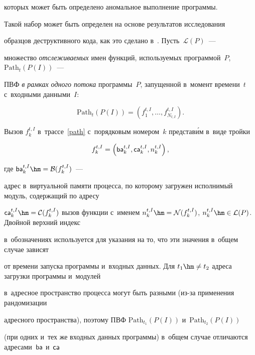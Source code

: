 которых может быть определено аномальное выполнение программы. 

Такой набор может быть определен на основе результатов исследования 

образцов деструктивного кода, как это сделано в~\cite{Gupta2018}. Пусть~$\mathcal{L}(P)$~--- 

множество \textit{отслеживаемых} имен функций, используемых программой~$P$, $\mathrm{Path}_t(P(I))$~--- 

ПВФ \textit{в рамках одного потока} программы~$P$, запущенной в~момент времени~$t$ с~входными данными~$I$:

\begin{equation}

\label{path}

\mathrm{Path}_t(P(I))=\left(f^{t,I}_1,\ldots,f^{t,I}_{N_{t,I}}\right).

\end{equation}

Вызов $f^{t,I}_k$ в~трассе~\eqref{path} с~порядковым номером~$k$ представ\'{и}м в~виде тройки

\begin{equation*}


f^{t,I}_k=\left({\sf ba}^{t,I}_k, {\sf ca}^{t,I}_k, n^{t,I}_k\right),

\end{equation*}

где ${\sf ba}^{t,I}_k\hm=\mathcal{B}(f^{t,I}_k)$~--- 

адрес в~виртуальной памяти процесса, по которому загружен исполнимый модуль, содержащий по адресу 

${\sf ca}^{t,I}_k\hm=\mathcal{C}(f^{t,I}_k)$ вызов функции с~именем $n^{t,I}_k\hm=

\mathcal{N}(f^{t,I}_k)$, $n^{t,I}_k\hm\in \mathcal{L}(P)$. Двойной верхний индекс 

в~обозначениях используется для указания на то, что эти значения в~общем случае зависят 

от времени запуска программы и~входных данных. Для $t_1\hm\neq t_2$ адреса загрузки программы и~модулей 

в~адресное пространство процесса могут быть разными (из-за применения рандомизации 

адресного пространства), поэтому ПВФ $\mathrm{Path}_{t_1}(P(I))$ и~$\mathrm{Path}_{t_2}(P(I))$ 

(при одних и~тех же входных данных программы) в~общем случае отличаются адресами~${\sf ba}$ и~${\sf ca}$ 

